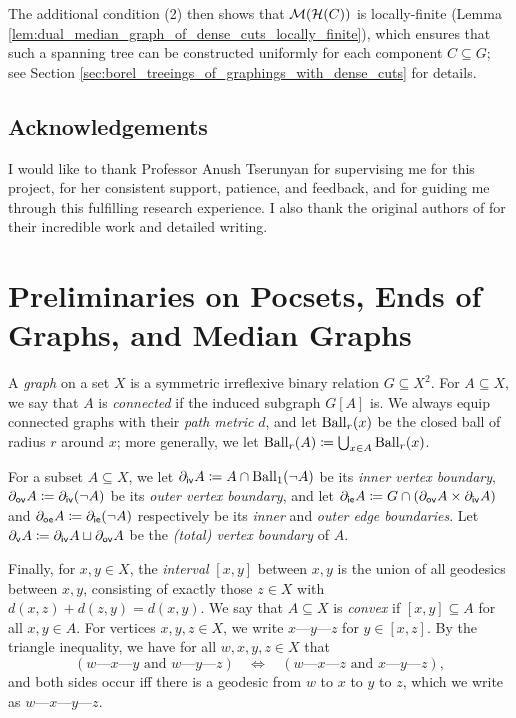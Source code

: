 \documentclass[reqno]{amsart}
\begin{document}
    The additional condition (2) then shows that $\mathcal{M}(\mathcal{H}(C))$ is locally-finite (Lemma \ref{lem:dual_median_graph_of_dense_cuts_locally_finite}), which ensures that such a spanning tree can be constructed uniformly for each component $C\subseteq G$; see Section \ref{sec:borel_treeings_of_graphings_with_dense_cuts} for details.

    \subsection*{Acknowledgements}

    I would like to thank Professor Anush Tserunyan for supervising me for this project, for her consistent support, patience, and feedback, and for guiding me through this fulfilling research experience. I also thank the original authors of \cite{CPTT23} for their incredible work and detailed writing.

    \section{Preliminaries on Pocsets, Ends of Graphs, and Median Graphs}\label{sec:preliminaries}
    \renewcommand{\-}{\textrm{---}}

    \begin{notation*}
        A \textit{graph} on a set $X$ is a symmetric irreflexive binary relation $G\subseteq X^2$. For $A\subseteq X$, we say that $A$ is \textit{connected} if the induced subgraph $G[A]$ is. We always equip connected graphs with their \textit{path metric} $d$, and let $\operatorname{Ball}_r(x)$ be the closed ball of radius $r$ around $x$; more generally, we let $\operatorname{Ball}_r(A)\coloneqq\bigcup_{x\in A}\operatorname{Ball}_r(x)$.

        For a subset $A\subseteq X$, we let $\partial_\mathsf{iv}A\coloneqq A\cap\operatorname{Ball}_1(\lnot A)$ be its \textit{inner vertex boundary}, $\partial_\mathsf{ov}A\coloneqq\partial_\mathsf{iv}(\lnot A)$ be its \textit{outer vertex boundary}, and let $\partial_\mathsf{ie}A\coloneqq G\cap(\partial_\mathsf{ov}A\times\partial_\mathsf{iv}A)$ and $\partial_\mathsf{oe}A\coloneqq\partial_\mathsf{ie}(\lnot A)$ respectively be its \textit{inner} and \textit{outer edge boundaries}. Let $\partial_\mathsf{v}A\coloneqq\partial_\mathsf{iv}A\sqcup\partial_\mathsf{ov}A$ be the \textit{(total) vertex boundary} of $A$.

        Finally, for $x,y\in X$, the \textit{interval} $[x,y]$ between $x,y$ is the union of all geodesics between $x,y$, consisting of exactly those $z\in X$ with $d(x,z)+d(z,y)=d(x,y)$. We say that $A\subseteq X$ is \textit{convex} if $[x,y]\subseteq A$ for all $x,y\in A$. For vertices $x,y,z\in X$, we write $x\-y\-z$ for $y\in[x,z]$. By the triangle inequality, we have for all $w,x,y,z\in X$ that
        \begin{equation*}
            (w\-x\-y\textrm{ and }w\-y\-z)\ \ \ \ \Leftrightarrow\ \ \ \ (w\-x\-z\textrm{ and }x\-y\-z),
        \end{equation*}
        and both sides occur iff there is a geodesic from $w$ to $x$ to $y$ to $z$, which we write as $w\-x\-y\-z$.
    \end{notation*}
\end{document}

